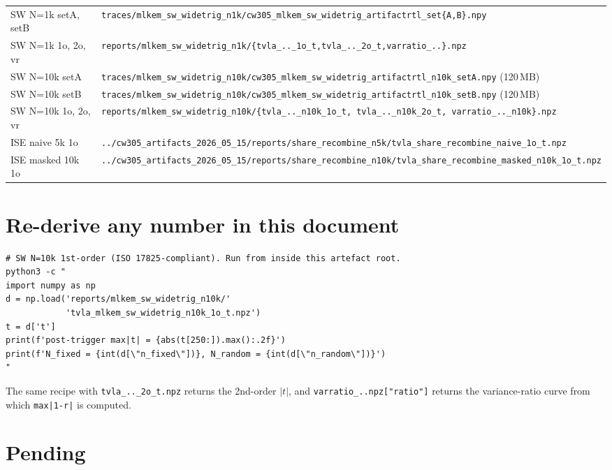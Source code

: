 \documentclass[11pt]{article}
\newcommand{\swart}{}                              %
\newcommand{\isert}{../cw305\_artifacts\_2026\_05\_15}
\begin{document}
\begin{tabularx}{\linewidth}{@{}lX@{}}
\toprule
SW N=1k setA, setB    & \texttt{\swart{}traces/mlkem\_sw\_widetrig\_n1k/cw305\_mlkem\_sw\_widetrig\_artifactrtl\_set\{A,B\}.npy} \\
SW N=1k 1o, 2o, vr    & \texttt{\swart{}reports/mlkem\_sw\_widetrig\_n1k/\{tvla\_..\_1o\_t,tvla\_..\_2o\_t,varratio\_..\}.npz} \\
\midrule
SW N=10k setA         & \texttt{\swart{}traces/mlkem\_sw\_widetrig\_n10k/cw305\_mlkem\_sw\_widetrig\_artifactrtl\_n10k\_setA.npy} (120\,MB) \\
SW N=10k setB         & \texttt{\swart{}traces/mlkem\_sw\_widetrig\_n10k/cw305\_mlkem\_sw\_widetrig\_artifactrtl\_n10k\_setB.npy} (120\,MB) \\
SW N=10k 1o, 2o, vr   & \texttt{\swart{}reports/mlkem\_sw\_widetrig\_n10k/\{tvla\_..\_n10k\_1o\_t, tvla\_..\_n10k\_2o\_t, varratio\_..\_n10k\}.npz} \\
\midrule
ISE naive 5k 1o       & \texttt{\isert{}/reports/share\_recombine\_n5k/tvla\_share\_recombine\_naive\_1o\_t.npz} \\
ISE masked 10k 1o     & \texttt{\isert{}/reports/share\_recombine\_n10k/tvla\_share\_recombine\_masked\_n10k\_1o\_t.npz} \\
\bottomrule
\end{tabularx}

\section{Re-derive any number in this document}

\begin{verbatim}
# SW N=10k 1st-order (ISO 17825-compliant). Run from inside this artefact root.
python3 -c "
import numpy as np
d = np.load('reports/mlkem_sw_widetrig_n10k/'
            'tvla_mlkem_sw_widetrig_n10k_1o_t.npz')
t = d['t']
print(f'post-trigger max|t| = {abs(t[250:]).max():.2f}')
print(f'N_fixed = {int(d[\"n_fixed\"])}, N_random = {int(d[\"n_random\"])}')
"
\end{verbatim}

The same recipe with \texttt{tvla\_..\_2o\_t.npz} returns the 2nd-order
$|t|$, and \texttt{varratio\_..npz["ratio"]} returns the variance-ratio
curve from which \texttt{max|1-r|} is computed.

\section{Pending}
\end{document}
